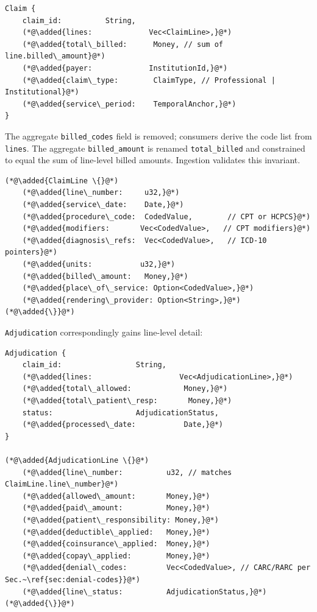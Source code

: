 \documentclass[11pt]{article}
\newcommand{\added}[1]{\textcolor{accentblue}{#1}}
\begin{document}
\begin{lstlisting}
Claim {
    claim_id:          String,
    (*@\added{lines:             Vec<ClaimLine>,}@*)
    (*@\added{total\_billed:      Money, // sum of line.billed\_amount}@*)
    (*@\added{payer:             InstitutionId,}@*)
    (*@\added{claim\_type:        ClaimType, // Professional | Institutional}@*)
    (*@\added{service\_period:    TemporalAnchor,}@*)
}
\end{lstlisting}

The aggregate \texttt{billed\_codes} field is removed; consumers derive
the code list from \texttt{lines}. The aggregate \texttt{billed\_amount}
is renamed \texttt{total\_billed} and constrained to equal the sum of
line-level billed amounts. Ingestion validates this invariant.

\begin{lstlisting}
(*@\added{ClaimLine \{}@*)
    (*@\added{line\_number:     u32,}@*)
    (*@\added{service\_date:    Date,}@*)
    (*@\added{procedure\_code:  CodedValue,        // CPT or HCPCS}@*)
    (*@\added{modifiers:       Vec<CodedValue>,   // CPT modifiers}@*)
    (*@\added{diagnosis\_refs:  Vec<CodedValue>,   // ICD-10 pointers}@*)
    (*@\added{units:           u32,}@*)
    (*@\added{billed\_amount:   Money,}@*)
    (*@\added{place\_of\_service: Option<CodedValue>,}@*)
    (*@\added{rendering\_provider: Option<String>,}@*)
(*@\added{\}}@*)
\end{lstlisting}

\texttt{Adjudication} correspondingly gains line-level detail:

\begin{lstlisting}
Adjudication {
    claim_id:                 String,
    (*@\added{lines:                    Vec<AdjudicationLine>,}@*)
    (*@\added{total\_allowed:            Money,}@*)
    (*@\added{total\_patient\_resp:       Money,}@*)
    status:                   AdjudicationStatus,
    (*@\added{processed\_date:           Date,}@*)
}

(*@\added{AdjudicationLine \{}@*)
    (*@\added{line\_number:          u32, // matches ClaimLine.line\_number}@*)
    (*@\added{allowed\_amount:       Money,}@*)
    (*@\added{paid\_amount:          Money,}@*)
    (*@\added{patient\_responsibility: Money,}@*)
    (*@\added{deductible\_applied:   Money,}@*)
    (*@\added{coinsurance\_applied:  Money,}@*)
    (*@\added{copay\_applied:        Money,}@*)
    (*@\added{denial\_codes:         Vec<CodedValue>, // CARC/RARC per Sec.~\ref{sec:denial-codes}}@*)
    (*@\added{line\_status:          AdjudicationStatus,}@*)
(*@\added{\}}@*)
\end{lstlisting}
\end{document}
